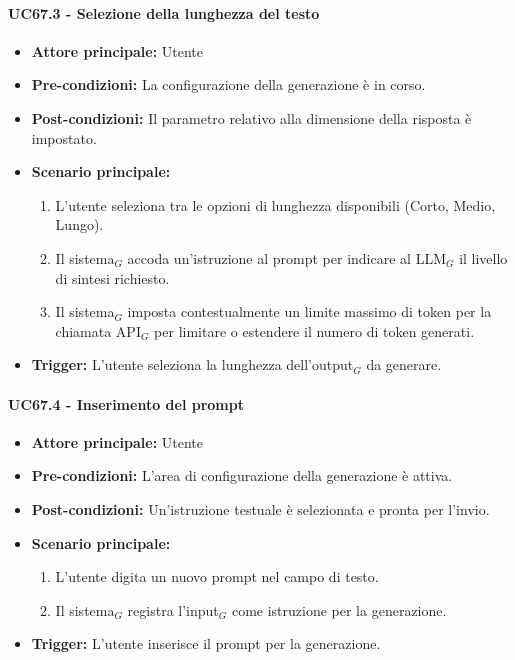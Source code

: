 \documentclass[a4paper, 10pt]{article}
\begin{document}
\paragraph{UC67.3 - Selezione della lunghezza del testo}
\hypertarget{uc:67.3}{}
\begin{itemize}
    \item \textbf{Attore principale:} Utente
    \item \textbf{Pre-condizioni:} La configurazione della generazione è in corso.
    \item \textbf{Post-condizioni:} Il parametro relativo alla dimensione della risposta è impostato.
    \item \textbf{Scenario principale:}
    \begin{enumerate}
        \item L'utente seleziona tra le opzioni di lunghezza disponibili (Corto, Medio, Lungo).
        \item Il sistema$_G$ accoda un'istruzione al prompt per indicare al LLM$_G$ il livello di sintesi richiesto.
        \item Il sistema$_G$ imposta contestualmente un limite massimo di token per la chiamata API$_G$ per limitare o estendere il numero di token generati.
    \end{enumerate}
    \item \textbf{Trigger:} L'utente seleziona la lunghezza dell'output$_G$ da generare.
\end{itemize}

\paragraph{UC67.4 - Inserimento del prompt}
\hypertarget{uc:67.4}{}
\begin{itemize}
    \item \textbf{Attore principale:} Utente
    \item \textbf{Pre-condizioni:} L'area di configurazione della generazione è attiva.
    \item \textbf{Post-condizioni:} Un'istruzione testuale è selezionata e pronta per l'invio.
    \item \textbf{Scenario principale:}
    \begin{enumerate}
        \item L'utente digita un nuovo prompt nel campo di testo.
        \item Il sistema$_G$ registra l'input$_G$ come istruzione per la generazione.
    \end{enumerate}
    \item \textbf{Trigger:} L'utente inserisce il prompt per la generazione.
\end{itemize}
\end{document}
